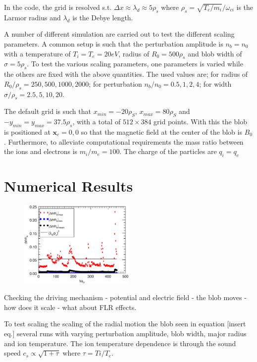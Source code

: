 \documentclass[9pt,twocolumn]{article}
\newcommand{\fd}[1]{\mathbf{#1}}
\renewcommand{\=}[1]{\stackrel{#1}{=}} %
\theoremstyle{definition}
\theoremstyle{remark}
\begin{document}
In the code, the grid is resolved s.t. $\Delta x\approx \lambda_d\approx 5\rho_s$ where $\rho_s=\sqrt{T_e/m_i}/\omega_{ci}$ is the Larmor radius and $\lambda_d$ is the Debye length.

A number of different simulation are carried out to test the different scaling parameters. A common setup is such that the perturbation amplitude is $n_b=n_0$ with a temperature of $T_i=T_e=20 eV$, radius of $R_0=500\rho_s$ and blob width of $\sigma = 5 \rho_s$. To test the various scaling parameters, one parameters is varied while the others are fixed with the above quantities. The used values are; for radius of $R_0/\rho_s = {250,500,1000,2000}$; for perturbation $n_b/n_0 = {0.5,1,2,4}$; for width $\sigma/\rho_s = {2.5,5,10,20}$.

The default grid is such that $x_{min}=-20\rho_S$, $x_{max}=80\rho_S$ and $-y_{min}=y_{max}=37.5\rho_s$, with a total of $512\times 384$ grid points. With this the blob is positioned at $\fd x_c = {0,0}$ so that the magnetic field at the center of the blob is $B_0$. Furthermore, to alleviate computational requirements the mass ratio between the ions and electrons is $m_i/m_e=100$. The charge of the particles are $q_i=q_e$
\section{Numerical Results}

\begin{figure}[h]
\center
	\includegraphics[width=0.5\textwidth]{Pictures/quasineuwl.eps}
	\label{quasi}
\end{figure}

Checking the driving mechanism - potential and electric field - the blob moves - how does it scale - what about FLR effects.

To test scaling the scaling of the radial motion the blob seen in equation [insert eq.] several runs with varying perturbation amplitude, blob width, major radius and ion temperature. The ion temperature dependence is through the sound speed $c_s\propto \sqrt{1+\tau}$ where $\tau = Ti/T_e$.
\end{document}
